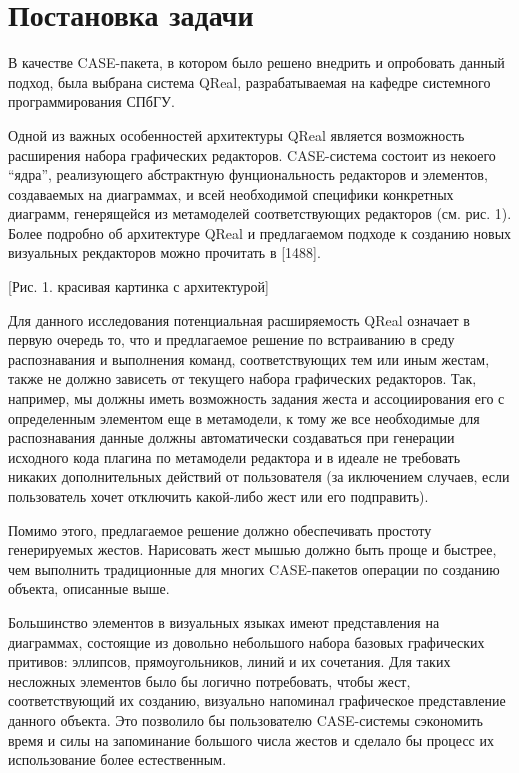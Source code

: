 \documentclass[a5paper]{article}
\begin{document}
\section{Постановка задачи}
В качестве CASE-пакета, в котором было решено внедрить и опробовать данный подход, была выбрана система QReal, разрабатываемая на кафедре 
системного программирования СПбГУ. 

Одной из важных особенностей архитектуры QReal является возможность расширения набора графических редакторов. CASE-система состоит из 
некоего ``ядра'', реализующего абстрактную фунциональность редакторов и элементов, создаваемых на диаграммах, и всей необходимой специфики 
конкретных диаграмм, генерящейся из метамоделей соответствующих редакторов (см. рис. 1). Более подробно об архитектуре QReal и предлагаемом 
подходе к  созданию новых визуальных рекдакторов можно прочитать в [1488]. 

[Рис. 1. красивая картинка с архитектурой]

Для данного исследования потенциальная расширяемость QReal означает в первую очередь то, что и предлагаемое решение по встраиванию в среду распознавания
и выполнения команд, соответствующих тем или иным жестам, также не должно зависеть от текущего набора графических редакторов. Так, например,
мы должны иметь возможность задания жеста и ассоциирования его с определенным элементом еще в метамодели, к тому же все необходимые 
для распознавания данные должны автоматически создаваться при генерации исходного кода плагина по метамодели редактора и в идеале не требовать 
никаких дополнительных действий от пользователя (за иключением случаев, если пользователь хочет отключить какой-либо жест или его подправить).

Помимо этого, предлагаемое решение должно обеспечивать простоту генерируемых жестов. Нарисовать жест мышью должно быть проще и быстрее, 
чем выполнить традиционные для многих CASE-пакетов операции по созданию объекта, описанные выше. 

Большинство элементов в визуальных языках имеют представления на диаграммах, состоящие из довольно небольшого набора базовых графических притивов: 
эллипсов, прямоугольников, линий и их сочетания. Для таких несложных элементов было бы логично потребовать, чтобы жест, соответствующий их созданию, 
визуально напоминал графическое представление данного объекта. Это позволило бы пользователю CASE-системы сэкономить время и силы на запоминание
большого числа жестов и сделало бы процесс их использование более естественным. 
\end{document}
